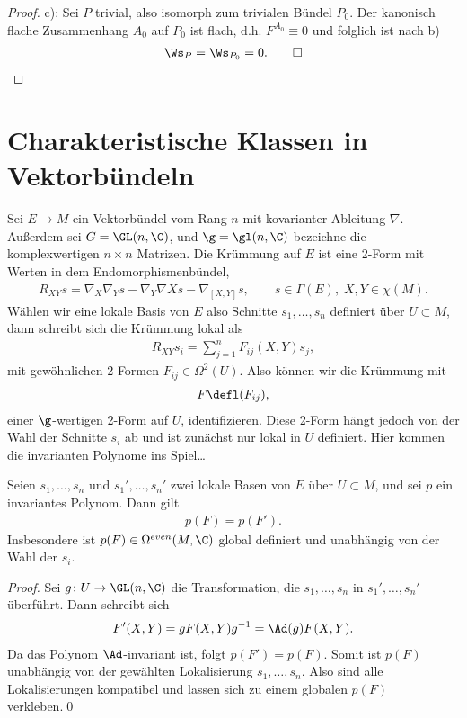 \documentclass[%
	paper=a5,%
	fleqn,%
	DIV=18,%
	BCOR=0mm,
	fontsize=11pt,
	titlepage=false,%
	bibliography=totoc,
	DIV=18,%
	twoside=true,
	pdftitle=Riemannsche Geometrie,
	pdfauthor=Uwe Semmelmann,
	numbers=noendperiod]%
	{scrbook}
\begin{document}
\begin{proof}
c): Sei $P$ trivial, also isomorph zum trivialen Bündel $P_0$. Der
kanonisch flache Zusammenhang $A_0$ auf $P_0$ ist flach, d.h. $F^{A_0}\equiv 0$
und folglich ist nach b)
\begin{align*}
\Ws_P = \Ws_{P_0} = 0.\qed
\end{align*}

\end{proof}

\section{Charakteristische Klassen in Vektorbündeln}

Sei $E\to M$ ein Vektorbündel vom Rang $n$ mit kovarianter Ableitung $\nabla$.
Außerdem sei $G = \GL(n,\C)$, und $\g = \gl(n,\C)$ bezeichne die
komplexwertigen $n\times n$ Matrizen. Die Krümmung auf $E$ ist eine 2-Form mit
Werten in dem Endomorphismenbündel,
\begin{align*}
R_{XY}s = \nabla_X\nabla_Y s - \nabla_Y \nabla X s - \nabla_{[X,Y]}s,\qquad
s\in \Gamma(E),\; X,Y\in \chi(M).
\end{align*}
Wählen wir eine lokale Basis von $E$ also Schnitte $s_1,\ldots,s_n$ definiert
über $U\subset M$, dann schreibt sich die Krümmung lokal als
\begin{align*}
R_{XY}s_i = \sum_{j=1}^n F_{ij}(X,Y)s_j,
\end{align*}
mit gewöhnlichen 2-Formen $F_{ij}\in\Omega^2(U)$. Also können wir die Krümmung
mit
\begin{align*}
F \defl (F_{ij}), 
\end{align*}
einer $\g$-wertigen 2-Form auf $U$, identifizieren. Diese 2-Form hängt jedoch von
der Wahl der Schnitte $s_i$ ab und ist zunächst nur lokal in $U$ definiert. Hier
kommen die invarianten Polynome ins Spiel\ldots

\begin{lem}
Seien $s_1,\ldots,s_n$ und $s_1',\ldots,s_n'$ zwei lokale Basen von $E$ über
$U\subset M$, und sei $p$ ein invariantes Polynom. Dann gilt
\begin{align*}
p(F) = p(F').
\end{align*}
Insbesondere ist $p(F)\in\Omega^{even}(M,\C)$ global definiert und unabhängig
von der Wahl der $s_i$.\fish
\end{lem}

\begin{proof}
Sei $g\colon U\to \GL(n,\C)$ die Transformation, die $s_1,\ldots,s_n$ in
$s_1',\ldots,s_n'$ überführt. Dann schreibt sich
\begin{align*}
F'(X,Y) = gF(X,Y)g^{-1} = \Ad(g)F(X,Y).
\end{align*}
Da das Polynom $\Ad$-invariant ist, folgt $p(F') = p(F)$. Somit ist $p(F)$
unabhängig von der gewählten Lokalisierung $s_1,\ldots,s_n$. Also sind alle
Lokalisierungen kompatibel und lassen sich zu einem globalen $p(F)$
verkleben.\qed
\end{proof}
\end{document}
